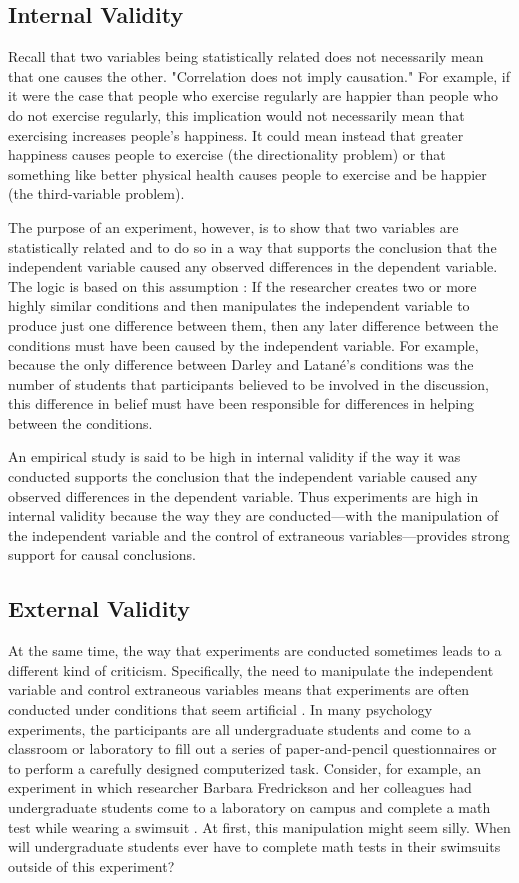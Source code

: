  \subsection{Internal Validity}
 
 Recall that two variables being statistically related does not necessarily mean that one causes the other. "Correlation does not imply causation." For example, if it were the case that people who exercise regularly are happier than people who do not exercise regularly, this implication would not necessarily mean that exercising increases people's happiness. It could mean instead that greater happiness causes people to exercise (the directionality problem) or that something like better physical health causes people to exercise and be happier (the third-variable problem).
 
 The purpose of an experiment, however, is to show that two variables are statistically related and to do so in a way that supports the conclusion that the independent variable caused any observed differences in the dependent variable. The logic is based on this assumption : If the researcher creates two or more highly similar conditions and then manipulates the independent variable to produce just one difference between them, then any later difference between the conditions must have been caused by the independent variable. For example, because the only difference between Darley and Latan\'e's conditions was the number of students that participants believed to be involved in the discussion, this difference in belief must have been responsible for differences in helping between the conditions.
 
 An empirical study is said to be high in internal validity if the way it was conducted supports the conclusion that the independent variable caused any observed differences in the dependent variable. Thus experiments are high in internal validity because the way they are conducted---with the manipulation of the independent variable and the control of extraneous variables---provides strong support for causal conclusions.
 
 \subsection{External Validity}
 
At the same time, the way that experiments are conducted sometimes leads to a different kind of criticism. Specifically, the need to manipulate the independent variable and control extraneous variables means that experiments are often conducted under conditions that seem artificial \citep{bauman_revisiting_2014}. In many psychology experiments, the participants are all undergraduate students and come to a classroom or laboratory to fill out a series of paper-and-pencil questionnaires or to perform a carefully designed computerized task. Consider, for example, an experiment in which researcher Barbara Fredrickson and her colleagues had undergraduate students come to a laboratory on campus and complete a math test while wearing a swimsuit \citep{fredrickson_that_1998}. At first, this manipulation might seem silly. When will undergraduate students ever have to complete math tests in their swimsuits outside of this experiment?
 
